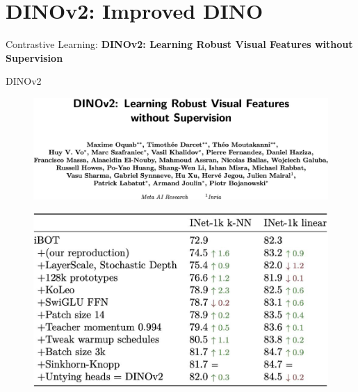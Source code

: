 \section{DINOv2: Improved DINO}
\begin{frame}{}
    \LARGE Contrastive Learning: \textbf{DINOv2: Learning Robust Visual Features without Supervision}
\end{frame}

\begin{frame}[allowframebreaks]{DINOv2}
\begin{figure}
    \centering
    \includegraphics[width=\linewidth,height=0.9\textheight,keepaspectratio]{images/contrastive/slide_93_1_img.png}
\end{figure}

\framebreak

\begin{figure}
    \centering
    \includegraphics[width=\linewidth,height=0.9\textheight,keepaspectratio]{images/contrastive/slide_94_1_img.png}
\end{figure}

\framebreak


\end{frame}
